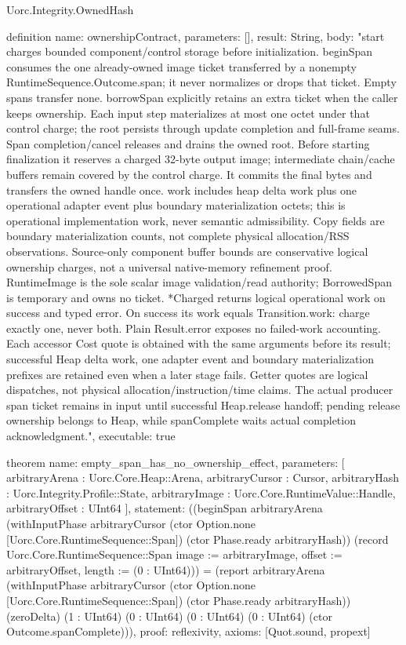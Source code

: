 \begin{lexlean}{Uorc.Integrity.OwnedHash}
\begin{semanticmodule}
definition{
  name: ownershipContract,
  parameters: [],
  result: String,
  body: "start charges bounded component/control storage before initialization. beginSpan consumes the one already-owned image ticket transferred by a nonempty RuntimeSequence.Outcome.span; it never normalizes or drops that ticket. Empty spans transfer none. borrowSpan explicitly retains an extra ticket when the caller keeps ownership. Each input step materializes at most one octet under that control charge; the root persists through update completion and full-frame seams. Span completion/cancel releases and drains the owned root. Before starting finalization it reserves a charged 32-byte output image; intermediate chain/cache buffers remain covered by the control charge. It commits the final bytes and transfers the owned handle once. work includes heap delta work plus one operational adapter event plus boundary materialization octets; this is operational implementation work, never semantic admissibility. Copy fields are boundary materialization counts, not complete physical allocation/RSS observations. Source-only component buffer bounds are conservative logical ownership charges, not a universal native-memory refinement proof. RuntimeImage is the sole scalar image validation/read authority; BorrowedSpan is temporary and owns no ticket. *Charged returns logical operational work on success and typed error. On success its work equals Transition.work: charge exactly one, never both. Plain Result.error exposes no failed-work accounting. Each accessor Cost quote is obtained with the same arguments before its result; successful Heap delta work, one adapter event and boundary materialization prefixes are retained even when a later stage fails. Getter quotes are logical dispatches, not physical allocation/instruction/time claims. The actual producer span ticket remains in input until successful Heap.release handoff; pending release ownership belongs to Heap, while spanComplete waits actual completion acknowledgment.",
  executable: true
}

theorem{
  name: empty_span_has_no_ownership_effect,
  parameters: [
    arbitraryArena : Uorc.Core.Heap::Arena,
    arbitraryCursor : Cursor,
    arbitraryHash : Uorc.Integrity.Profile::State,
    arbitraryImage : Uorc.Core.RuntimeValue::Handle,
    arbitraryOffset : UInt64
  ],
  statement: ((beginSpan arbitraryArena (withInputPhase arbitraryCursor (ctor Option.none [Uorc.Core.RuntimeSequence::Span]) (ctor Phase.ready arbitraryHash)) (record Uorc.Core.RuntimeSequence::Span {image := arbitraryImage, offset := arbitraryOffset, length := (0 : UInt64)})) = (report arbitraryArena (withInputPhase arbitraryCursor (ctor Option.none [Uorc.Core.RuntimeSequence::Span]) (ctor Phase.ready arbitraryHash)) (zeroDelta) (1 : UInt64) (0 : UInt64) (0 : UInt64) (0 : UInt64) (ctor Outcome.spanComplete))),
  proof: reflexivity{},
  axioms: [Quot.sound, propext]
}


\end{semanticmodule}
\end{lexlean}
